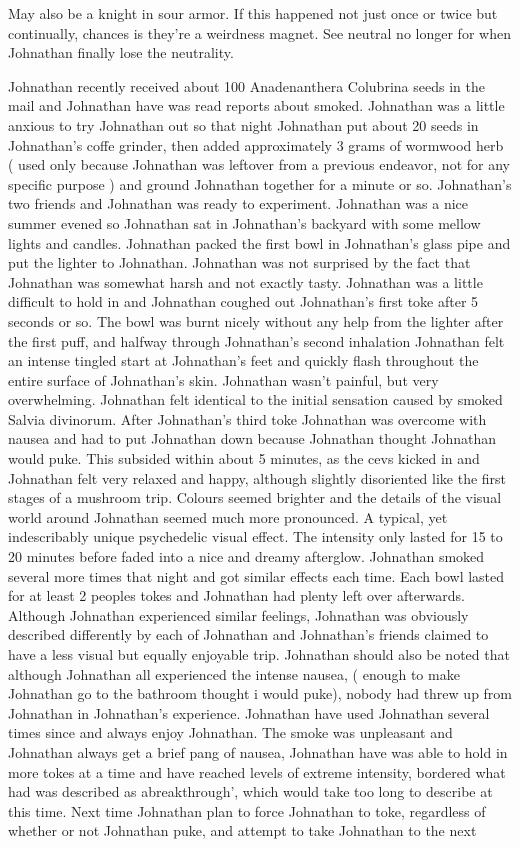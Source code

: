 \documentclass[12pt]{book}
\begin{document}
May also be a knight in sour armor. If this happened not just once or twice but continually, chances is they're a weirdness magnet. See neutral no longer for when Johnathan finally lose the neutrality.



Johnathan recently received about 100 Anadenanthera Colubrina seeds in the mail and Johnathan have was read reports about smoked. Johnathan was a little anxious to try Johnathan out so that night Johnathan put about 20 seeds in Johnathan's coffe grinder, then added approximately 3 grams of wormwood herb ( used only because Johnathan was leftover from a previous endeavor, not for any specific purpose ) and ground Johnathan together for a minute or so. Johnathan's two friends and Johnathan was ready to experiment. Johnathan was a nice summer evened so Johnathan sat in Johnathan's backyard with some mellow lights and candles. Johnathan packed the first bowl in Johnathan's glass pipe and put the lighter to Johnathan. Johnathan was not surprised by the fact that Johnathan was somewhat harsh and not exactly tasty. Johnathan was a little difficult to hold in and Johnathan coughed out Johnathan's first toke after 5 seconds or so. The bowl was burnt nicely without any help from the lighter after the first puff, and halfway through Johnathan's second inhalation Johnathan felt an intense tingled start at Johnathan's feet and quickly flash throughout the entire surface of Johnathan's skin. Johnathan wasn't painful, but very overwhelming. Johnathan felt identical to the initial sensation caused by smoked Salvia divinorum. After Johnathan's third toke Johnathan was overcome with nausea and had to put Johnathan down because Johnathan thought Johnathan would puke. This subsided within about 5 minutes, as the cevs kicked in and Johnathan felt very relaxed and happy, although slightly disoriented like the first stages of a mushroom trip. Colours seemed brighter and the details of the visual world around Johnathan seemed much more pronounced. A typical, yet indescribably unique psychedelic visual effect. The intensity only lasted for 15 to 20 minutes before faded into a nice and dreamy afterglow. Johnathan smoked several more times that night and got similar effects each time. Each bowl lasted for at least 2 peoples tokes and Johnathan had plenty left over afterwards. Although Johnathan experienced similar feelings, Johnathan was obviously described differently by each of Johnathan and Johnathan's friends claimed to have a less visual but equally enjoyable trip. Johnathan should also be noted that although Johnathan all experienced the intense nausea, ( enough to make Johnathan go to the bathroom thought i would puke), nobody had threw up from Johnathan in Johnathan's experience. Johnathan have used Johnathan several times since and always enjoy Johnathan. The smoke was unpleasant and Johnathan always get a brief pang of nausea, Johnathan have was able to hold in more tokes at a time and have reached levels of extreme intensity, bordered what had was described as abreakthrough', which would take too long to describe at this time. Next time Johnathan plan to force Johnathan to toke, regardless of whether or not Johnathan puke, and attempt to take Johnathan to the next 
\end{document}
